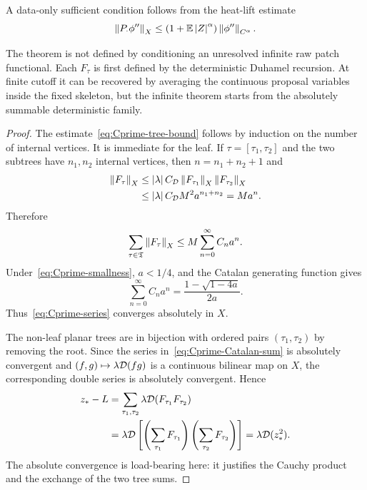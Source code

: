 A data-only sufficient condition follows from the heat-lift estimate
\begin{equation*}
  \left\lVert P_\cdot\phi''\right\rVert_X
  \leq
  (1+\mathbb E\left|Z\right|^\alpha)\left\lVert\phi''\right\rVert_{C^\alpha}.
\end{equation*}

The theorem is not defined by conditioning an unresolved infinite raw patch functional. Each $F_\tau$ is first defined by the deterministic Duhamel recursion. At finite cutoff it can be recovered by averaging the continuous proposal variables inside the fixed skeleton, but the infinite theorem starts from the absolutely summable deterministic family.

\begin{proof}
The estimate~\eqref{eq:Cprime-tree-bound} follows by induction on the number of internal vertices. It is immediate for the leaf. If $\tau=[\tau_1,\tau_2]$ and the two subtrees have $n_1,n_2$ internal vertices, then $n=n_1+n_2+1$ and
\begin{align*}
  \left\lVert F_\tau\right\rVert_X
  &\leq
  \left|\lambda\right| C_{\mathcal D}
  \left\lVert F_{\tau_1}\right\rVert_X
  \left\lVert F_{\tau_2}\right\rVert_X \\
  &\leq
  \left|\lambda\right| C_{\mathcal D}
  M^2a^{n_1+n_2}
  =
  Ma^n.
\end{align*}
Therefore
\begin{equation}
  \sum_{\tau\in\mathfrak T}\left\lVert F_\tau\right\rVert_X
  \leq
  M\sum_{n=0}^\infty C_na^n.
  \label{eq:Cprime-Catalan-sum}
\end{equation}
Under~\eqref{eq:Cprime-smallness}, $a<1/4$, and the Catalan generating function gives
\begin{equation}
  \sum_{n=0}^\infty C_na^n
  =
  \frac{1-\sqrt{1-4a}}{2a}.
  \label{eq:Catalan-generating}
\end{equation}
Thus~\eqref{eq:Cprime-series} converges absolutely in $X$.

The non-leaf planar trees are in bijection with ordered pairs $(\tau_1,\tau_2)$ by removing the root. Since the series in~\eqref{eq:Cprime-Catalan-sum} is absolutely convergent and $(f,g)\mapsto\lambda\mathcal D(fg)$ is a continuous bilinear map on $X$, the corresponding double series is absolutely convergent. Hence
\begin{align*}
  z_*-L
  &=
  \sum_{\tau_1,\tau_2}
  \lambda\mathcal D(F_{\tau_1}F_{\tau_2}) \\
  &=
  \lambda\mathcal D\left[
    \left(\sum_{\tau_1}F_{\tau_1}\right)
    \left(\sum_{\tau_2}F_{\tau_2}\right)
  \right]
  =
  \lambda\mathcal D(z_*^2).
\end{align*}
The absolute convergence is load-bearing here: it justifies the Cauchy product and the exchange of the two tree sums.


\end{proof}
